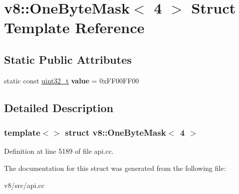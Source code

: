 \hypertarget{structv8_1_1OneByteMask_3_014_01_4}{}\section{v8\+:\+:One\+Byte\+Mask$<$ 4 $>$ Struct Template Reference}
\label{structv8_1_1OneByteMask_3_014_01_4}
\subsection*{Static Public Attributes}
\begin{DoxyCompactItemize}
\item 
\mbox{\label{structv8_1_1OneByteMask_3_014_01_4_af50f63869f0617580be0e3fbb80ea583}} 
static const \mbox{\hyperlink{classuint32__t}{uint32\+\_\+t}} {\bfseries value} = 0x\+F\+F00\+F\+F00
\end{DoxyCompactItemize}


\subsection{Detailed Description}
\subsubsection*{template$<$$>$\newline
struct v8\+::\+One\+Byte\+Mask$<$ 4 $>$}



Definition at line 5189 of file api.\+cc.



The documentation for this struct was generated from the following file\+:\begin{DoxyCompactItemize}
\item 
v8/src/api.\+cc\end{DoxyCompactItemize}
